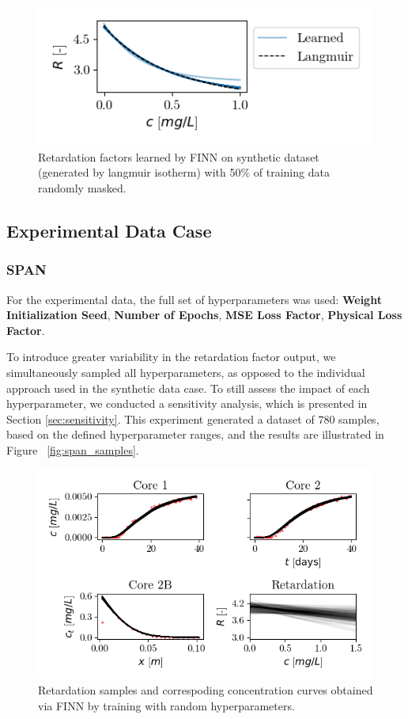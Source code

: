 \begin{figure}[h]
    \centering
    \includegraphics{figs/finn_synthetic_SPAN_losspattern.png}
    \caption{Retardation factors learned by FINN on synthetic dataset (generated by langmuir isotherm) with 50\% of training data randomly masked.}
    \label{fig:synthetic_SPAN_losspattern}
\end{figure}






\subsection{Experimental Data Case}

\subsubsection{SPAN}
For the experimental data, the full set of hyperparameters was used: \textbf{Weight Initialization Seed}, \textbf{Number of Epochs}, \textbf{MSE Loss Factor}, \textbf{Physical Loss Factor}.

To introduce greater variability in the retardation factor output, we simultaneously sampled all hyperparameters, as opposed to the individual approach used in the synthetic data case. To still assess the impact of each hyperparameter, we conducted a sensitivity analysis, which is presented in Section \vref{sec:sensitivity}. This experiment generated a dataset of $780$ samples, based on the defined hyperparameter ranges, and the results are illustrated in Figure ~\vref{fig:span_samples}.

\begin{figure}[h]
    \centering
    \includegraphics{figs/finn_span_samples.png}
    \caption{Retardation samples and correspoding concentration curves obtained via FINN by training with random hyperparameters.}
    \label{fig:span_samples}
\end{figure}

